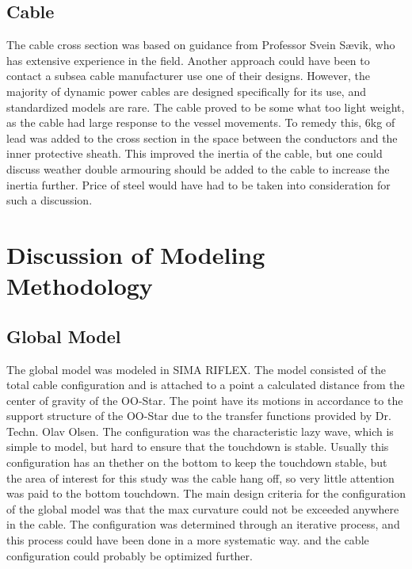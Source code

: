 \subsection{Cable}
\label{sec:disccable}
The cable cross section was based on guidance from Professor Svein Sævik, who has extensive experience in the field. Another approach could have been to contact a subsea cable manufacturer use one of their designs.  However, the majority of dynamic power cables are designed specifically for its use, and standardized models are rare. The cable proved to be some what too light weight, as the cable had large response to the vessel movements. To remedy this, 6kg of lead was added to the cross section in the space between the conductors and the inner protective sheath. This improved the inertia of the cable, but one could discuss weather double armouring should be added to the cable to increase the inertia further. Price of steel would have had to be taken into consideration for such a discussion.
\section{Discussion of Modeling Methodology}
\subsection{Global Model}
 The global model was modeled in SIMA RIFLEX. The model consisted of the total cable configuration and is attached to a point a calculated distance from the center of gravity of the OO-Star. The point have its motions in accordance to the support structure of the OO-Star due to the transfer functions provided by Dr. Techn. Olav Olsen. The configuration was the characteristic lazy wave, which is simple to model, but hard to ensure that the touchdown is stable. Usually this configuration has an thether on the bottom to keep the touchdown stable, but the area of interest for this study was the cable hang off, so very little attention was paid to the bottom touchdown. The main design criteria for the configuration of the global model was that the max curvature could not be exceeded anywhere in the cable. The configuration was determined through an iterative process, and this process could have been done in a more systematic way. and the cable configuration could probably be optimized further.
